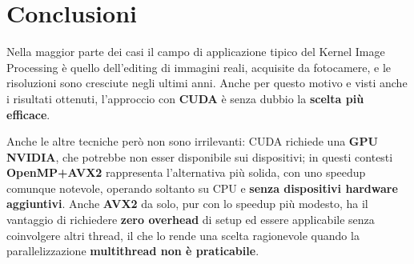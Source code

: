 \documentclass{article}
\begin{document}
\section{Conclusioni}
Nella maggior parte dei casi il campo di applicazione tipico del Kernel Image Processing è quello dell'editing di immagini reali, acquisite da fotocamere, e le risoluzioni sono cresciute negli ultimi anni. Anche per questo motivo e visti anche i risultati ottenuti, l'approccio con \textbf{CUDA} è senza dubbio la \textbf{scelta più efficace}.
 
\noindent Anche le altre tecniche però non sono irrilevanti: CUDA richiede una \textbf{GPU NVIDIA}, che potrebbe non esser disponibile sui dispositivi; in questi contesti \textbf{OpenMP+AVX2} rappresenta l'alternativa più solida, con uno speedup comunque notevole, operando soltanto su CPU e \textbf{senza dispositivi hardware aggiuntivi}.
Anche \textbf{AVX2} da solo, pur con lo speedup più modesto, ha il vantaggio di richiedere \textbf{zero overhead} di setup ed essere applicabile senza coinvolgere altri thread, il che lo rende una scelta ragionevole quando la parallelizzazione \textbf{multithread non è praticabile}.
\end{document}
